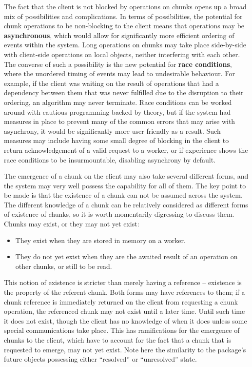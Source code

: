 The fact that the client is not blocked by operations on chunks opens up a broad mix of possibilities and complications.
In terms of possibilities, the potential for chunk operations to be non-blocking to the client means that operations may be \textbf{asynchronous}, which would allow for significantly more efficient ordering of events within the system.
Long operations on chunks may take place side-by-side with client-side operations on local objects, neither interfering with each other.
The converse of such a possibility is the new potential for \textbf{race conditions}, where the unordered timing of events may lead to undesirable behaviour.
For example, if the client was waiting on the result of operations that had a dependency between them that was never fulfilled due to the disruption to their ordering, an algorithm may never terminate.
Race conditions can be worked around with cautious programming backed by theory, but if the system had measures in place to prevent many of the common errors that may arise with asynchrony, it would be significantly more user-friendly as a result.
Such measures may include having some small degree of blocking in the client to return acknowledgement of a valid request to a worker, or if experience shows the race conditions to be insurmountable, disabling asynchrony by default.

The emergence of a chunk on the client may also take several different forms, and the system may very well possess the capability for all of them.
The key point to be made is that the existence of a chunk can not be assumed across the system.
The different knowledge of a chunk can be relatively considered as different forms of existence of chunks, so it is worth momentarily digressing to discuss them.
Chunks may exist, or they may not yet exist:

\begin{itemize}
	\item
	      They exist when they are stored in memory on a worker.
	\item
	      They do not yet exist when they are the awaited result of an operation
	      on other chunks, or still to be read.
\end{itemize}

This notion of existence is stricter than merely having a reference -- existence is the property of the referent chunk.
Both forms may have references to them; if a chunk reference is immediately returned on the client from requesting a chunk operation, the referenced chunk may not exist until a later time.
Until such time it does not exist, though the client has no knowledge of when it does unless some special communications take place.
This has ramifications for the emergence of chunks to the client, which have to account for the fact that a chunk that is requested to emerge, may not yet exist.
Note here the similarity to the  package's future objects possessing either ``resolved'' or ``unresolved'' state.

